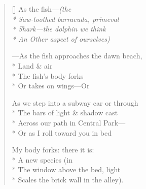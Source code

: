 \label{ch:in_a_dark_corner}
\settowidth{\versewidth}{As we step into a subway car or through}
\begin{verse}[\versewidth]
As the fish---\textit{(the\\*
Saw-toothed barracuda, primeval\\*
Shark---the dolphin we think\\*
An Other aspect of ourselves)}

---As the fish approaches the dawn beach,\\*
Land \& air\\*
The fish's body forks\\*
Or takes on wings---Or

As we step into a subway car or through\\*
The bars of light \& shadow cast\\*
Across our path in Central Park---\\*
Or as I roll toward you in bed

My body forks: there it is:\\*
A new species \qquad (in\\*
The window above the bed, light\\*
Scales the brick wall in the alley).
\end{verse}
